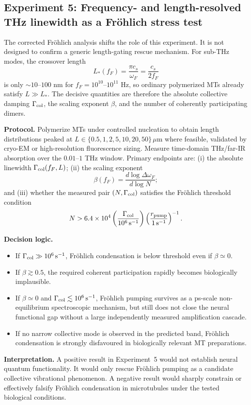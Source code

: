 \documentclass[twocolumn,10pt]{article}
\begin{document}
\subsection{Experiment 5: Frequency- and length-resolved THz linewidth
as a Fr\"ohlich stress test}
\label{sec:exp5}
The corrected Fr\"ohlich analysis shifts the role of this experiment. It is
not designed to confirm a generic length-gating rescue mechanism. For
sub-THz modes, the crossover length
\[
L_*(f_F)=\frac{\pi c_s}{\omega_F}
=\frac{c_s}{2 f_F}
\]
is only $\sim10$--$100$ nm for $f_F=10^{10}$--$10^{11}$ Hz, so ordinary
polymerized MTs already satisfy $L\gg L_*$. The decisive quantities are
therefore the absolute collective damping $\Gamma_{\rm col}$, the scaling
exponent $\beta$, and the number of coherently participating dimers.

\textbf{Protocol.} Polymerize MTs under controlled nucleation to obtain
length distributions peaked at
$L\in\{0.5,1,2,5,10,20,50\}\,\mu$m where feasible, validated by cryo-EM
or high-resolution fluorescence sizing. Measure time-domain THz/far-IR
absorption over the $0.01$--$1$ THz window. Primary endpoints are:
(i) the absolute linewidth $\Gamma_{\rm col}(f_F,L)$;
(ii) the scaling exponent
\[
\beta(f_F)=\frac{d\log\Delta\omega_F}{d\log N};
\]
and (iii) whether the measured pair $(N,\Gamma_{\rm col})$ satisfies the
Fr\"ohlich threshold condition
\[
N>
6.4\times10^4
\left(\frac{\Gamma_{\rm col}}{10^6\,{\rm s}^{-1}}\right)
\left(\frac{r_{\rm pump}}{1\,{\rm s}^{-1}}\right)^{-1}.
\]

\textbf{Decision logic.}
\begin{itemize}
\item If $\Gamma_{\rm col}\gg10^6\,{\rm s}^{-1}$, Fr\"ohlich condensation is
below threshold even if $\beta\simeq0$.
\item If $\beta\gtrsim0.5$, the required coherent participation rapidly
becomes biologically implausible.
\item If $\beta\simeq0$ and $\Gamma_{\rm col}\lesssim10^6\,{\rm s}^{-1}$,
Fr\"ohlich pumping survives as a ps-scale non-equilibrium spectroscopic
mechanism, but still does not close the neural functional gap without a
large independently measured amplification cascade.
\item If no narrow collective mode is observed in the predicted band,
Fr\"ohlich condensation is strongly disfavoured in biologically relevant MT
preparations.
\end{itemize}

\textbf{Interpretation.} A positive result in Experiment~5 would not establish
neural quantum functionality. It would only rescue Fr\"ohlich pumping as a
candidate collective vibrational phenomenon. A negative result would sharply
constrain or effectively falsify Fr\"ohlich condensation in microtubules under
the tested biological conditions.
\end{document}
